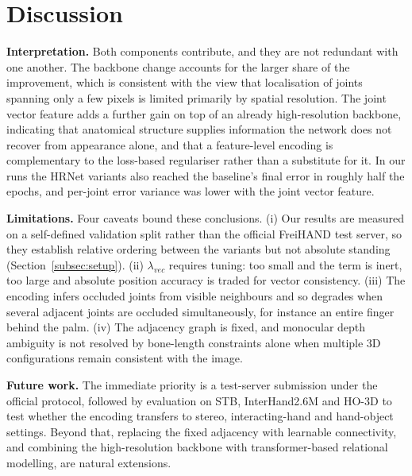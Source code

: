 \section{Discussion}
\textbf{Interpretation.} Both components contribute, and they are not redundant with one another. The backbone change accounts for the larger share of the improvement, which is consistent with the view that localisation of joints spanning only a few pixels is limited primarily by spatial resolution. The joint vector feature adds a further gain on top of an already high-resolution backbone, indicating that anatomical structure supplies information the network does not recover from appearance alone, and that a feature-level encoding is complementary to the loss-based regulariser rather than a substitute for it. In our runs the HRNet variants also reached the baseline's final error in roughly half the epochs, and per-joint error variance was lower with the joint vector feature.

\textbf{Limitations.} Four caveats bound these conclusions. (i) Our results are measured on a self-defined validation split rather than the official FreiHAND test server, so they establish relative ordering between the variants but not absolute standing (Section~\ref{subsec:setup}). (ii) $\lambda_{vec}$ requires tuning: too small and the term is inert, too large and absolute position accuracy is traded for vector consistency. (iii) The encoding infers occluded joints from visible neighbours and so degrades when several adjacent joints are occluded simultaneously, for instance an entire finger behind the palm. (iv) The adjacency graph is fixed, and monocular depth ambiguity is not resolved by bone-length constraints alone when multiple 3D configurations remain consistent with the image.

\textbf{Future work.} The immediate priority is a test-server submission under the official protocol, followed by evaluation on STB, InterHand2.6M and HO-3D to test whether the encoding transfers to stereo, interacting-hand and hand-object settings. Beyond that, replacing the fixed adjacency with learnable connectivity, and combining the high-resolution backbone with transformer-based relational modelling, are natural extensions.

